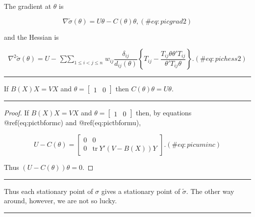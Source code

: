 \documentclass[
  12pt,
  letterpaper,
  DIV=11,
  numbers=noendperiod]{scrreprt}
\theoremstyle{remark}
\begin{document}
The gradient at \(\theta\) is

\begin{equation}
\nabla\tilde\sigma(\theta)=U\theta-C(\theta)\theta,
(\#eq:picgrad2)
\end{equation}

and the Hessian is

\begin{equation}
\nabla^2\tilde\sigma(\theta)=U-\mathop{\sum\sum}_{1\leq i<j\leq n}
w_{ij}\frac{\delta_{ij}}{d_{ij}(\theta)}\left\{T_{ij}-\frac{T_{ij}\theta\theta'T_{ij}}{\theta'T_{ij}\theta}\right\}.
(\#eq:pichess2)
\end{equation}

\begin{center}\rule{0.5\linewidth}{0.5pt}\end{center}

\label{pictpreserve}
If \(B(X)X=VX\) and \(\theta=\begin{bmatrix}1&0\end{bmatrix}\) then
\(C(\theta)\theta=U\theta\).

\begin{center}\rule{0.5\linewidth}{0.5pt}\end{center}

\begin{proof}
If \(B(X)X=VX\) and \(\theta=\begin{bmatrix}1&0\end{bmatrix}\) then, by
equations @ref(eq:pictbformc) and @ref(eq:pictbformu),

\begin{equation}
U-C(\theta)=\begin{bmatrix}0&0\\0&\text{tr}\ Y'(V-B(X))Y\end{bmatrix}.
(\#eq:picuminc)
\end{equation}

Thus \((U-C(\theta))\theta=0\).
\end{proof}

\begin{center}\rule{0.5\linewidth}{0.5pt}\end{center}

Thus each stationary point of \(\sigma\) gives a stationary point of
\(\tilde\sigma\). The other way around, however, we are not so lucky.

\begin{center}\rule{0.5\linewidth}{0.5pt}\end{center}
\end{document}
